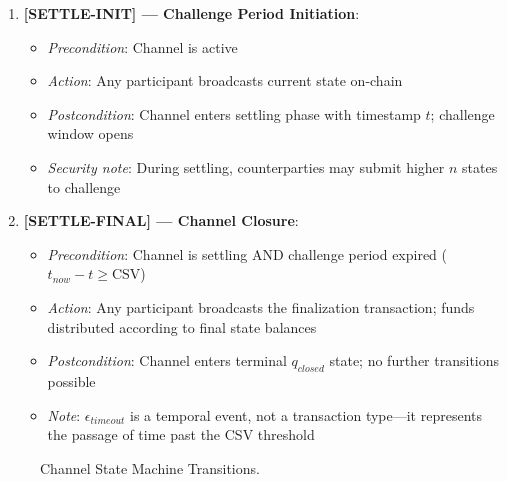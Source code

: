 \begin{enumerate}
    \item \textbf{[SETTLE-INIT] --- Challenge Period Initiation}:
    \begin{itemize}
        \item \textit{Precondition}: Channel is active
        \item \textit{Action}: Any participant broadcasts current state on-chain
        \item \textit{Postcondition}: Channel enters settling phase with timestamp $t$; challenge window opens
        \item \textit{Security note}: During settling, counterparties may submit higher $n$ states to challenge
    \end{itemize}
    
    \item \textbf{[SETTLE-FINAL] --- Channel Closure}:
    \begin{itemize}
        \item \textit{Precondition}: Channel is settling AND challenge period expired ($t_{now} - t \geq \text{CSV}$)
        \item \textit{Action}: Any participant broadcasts the finalization transaction; funds distributed according to final state balances
        \item \textit{Postcondition}: Channel enters terminal $q_{closed}$ state; no further transitions possible
        \item \textit{Note}: $\epsilon_{timeout}$ is a temporal event, not a transaction type---it represents the passage of time past the CSV threshold
    \end{itemize}
\end{enumerate}

\begin{figure}[htbp]
\centering
{}
\caption{Channel State Machine Transitions.}
\label{fig:state-machine}
\end{figure}

